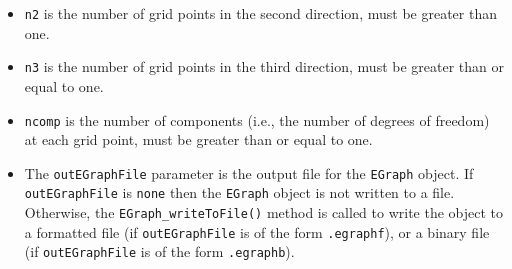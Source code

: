 \begin{enumerate}
\begin{itemize}
{\tt n1} is the number of grid points in the first direction,
must be greater than one.
\item
{\tt n2} is the number of grid points in the second direction,
must be greater than one.
\item
{\tt n3} is the number of grid points in the third direction,
must be greater than or equal to one.
\item
{\tt ncomp} is the number of components (i.e., the number of 
degrees of freedom) at each grid point,
must be greater than or equal to one.
\item
The {\tt outEGraphFile} parameter 
is the output file for the {\tt EGraph} object. 
If {\tt outEGraphFile} is {\tt none} then 
the {\tt EGraph} object is not written to a file. 
Otherwise, the {\tt EGraph\_writeToFile()} method is called to write
the object to a formatted file (if {\tt outEGraphFile} 
is of the form {\tt *.egraphf}), or
a binary file (if {\tt outEGraphFile} is of the form {\tt *.egraphb}).
\end{itemize}
\end{enumerate}
